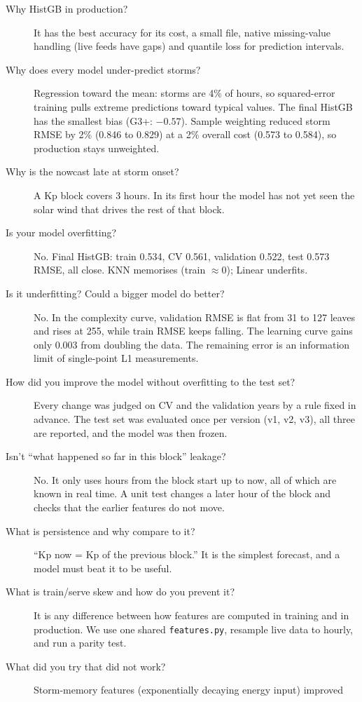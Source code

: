 \documentclass[11pt,a4paper]{article}
\newcommand{\code}[1]{\texttt{#1}}
\begin{document}
\begin{description}
\item[Why HistGB in production?] It has the best accuracy for its cost, a small file, native missing-value
handling (live feeds have gaps) and quantile loss for prediction intervals.
\item[Why does every model under-predict storms?] Regression toward the mean: storms are 4\% of hours, so
squared-error training pulls extreme predictions toward typical values. The final HistGB has the smallest bias
(G3+: $-0.57$). Sample weighting reduced storm RMSE by 2\% (0.846 to 0.829) at a 2\% overall cost (0.573 to
0.584), so production stays unweighted.
\item[Why is the nowcast late at storm onset?] A Kp block covers 3 hours. In its first hour the model has not yet
seen the solar wind that drives the rest of that block.
\item[Is your model overfitting?] No. Final HistGB: train 0.534, CV 0.561, validation 0.522, test 0.573 RMSE,
all close. KNN memorises (train $\approx$0); Linear underfits.
\item[Is it underfitting? Could a bigger model do better?] No. In the complexity curve, validation RMSE is flat from
31 to 127 leaves and rises at 255, while train RMSE keeps falling. The learning curve gains only 0.003 from
doubling the data. The remaining error is an information limit of single-point L1 measurements.
\item[How did you improve the model without overfitting to the test set?] Every change was judged on CV and the
validation years by a rule fixed in advance. The test set was evaluated once per version (v1, v2, v3), all
three are reported, and the model was then frozen.
\item[Isn't ``what happened so far in this block'' leakage?] No. It only uses hours from the block start up to
now, all of which are known in real time. A unit test changes a later hour of the block and checks that the
earlier features do not move.
\item[What is persistence and why compare to it?] ``Kp now = Kp of the previous block.'' It is the simplest
forecast, and a model must beat it to be useful.
\item[What is train/serve skew and how do you prevent it?] It is any difference between how features are
computed in training and in production. We use one shared \code{features.py}, resample live data to hourly, and
run a parity test.
\item[What did you try that did not work?] Storm-memory features (exponentially decaying energy input) improved

\end{description}
\end{document}
